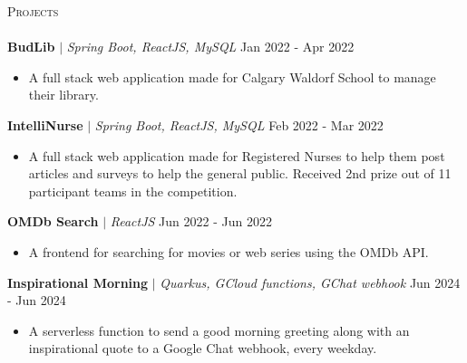 \documentclass[a4paper]{article}
\newcommand{\lineunder} {
    \vspace*{-8pt} \\
    \hspace*{-18pt} \hrulefill \\
}
\newcommand{\header} [1] {
    {\hspace*{-18pt}\vspace*{6pt} \textsc{#1}}
    \vspace*{-6pt} \lineunder
}
\newcommand{\resumeItemProject}[1]{
  \item{
    \begin{justify}
    \setlength{\rightskip}{0.15in} {#1 \vspace{-4pt}}
    \end{justify}
  }
}
\begin{document}
\header{Projects}
\vspace{1mm}
{\textbf{BudLib}} $|$ \emph{Spring Boot, ReactJS, MySQL} \hfill {Jan 2022 - Apr 2022}
\begin{itemize}
    \resumeItemProject {A full stack web application made for Calgary Waldorf School to manage their library.}


\end{itemize}
\vspace*{1mm}
{\textbf{IntelliNurse}} $|$ \emph{Spring Boot, ReactJS, MySQL} \hfill {Feb 2022 - Mar 2022}
\begin{itemize}
    \resumeItemProject {A full stack web application made for Registered Nurses to help them post articles and surveys to help the general public. Received 2nd prize out of 11 participant teams in the competition.}

\end{itemize}
\vspace*{1mm}
{\textbf{OMDb Search}} $|$ \emph{ReactJS} \hfill {Jun 2022 - Jun 2022}
\begin{itemize}
    \resumeItemProject {A frontend for searching for movies or web series using the OMDb API.}
\vspace*{1mm}
\end{itemize}
\vspace*{1mm}
{\textbf{Inspirational Morning}} $|$ \emph{Quarkus, GCloud functions, GChat webhook} \hfill {Jun 2024 - Jun 2024}
\begin{itemize}
    \resumeItemProject {A serverless function to send a good morning greeting along with an inspirational quote to a Google Chat webhook, every weekday.}
\vspace*{1mm}
\end{itemize}
\end{document}
